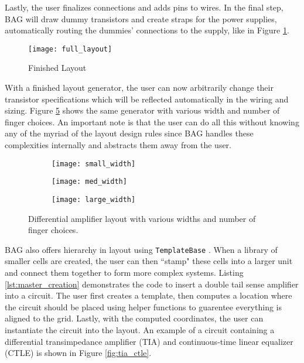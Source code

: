 Lastly, the user finalizes connections and adds pins to wires. In the final step, BAG will draw dummy transistors and create straps for the power supplies, automatically routing the dummies' connections to the supply, like in Figure \ref{fig:finished_layout}.
\begin{figure}[h]
\centering
\texttt{[image: full\_layout]}
\caption{Finished Layout}
\label{fig:finished_layout}
\end{figure}
With a finished layout generator, the user can now arbitrarily change their transistor specifications which will be reflected automatically in the wiring and sizing. Figure \ref{fig:width_changes} shows the same generator with various width and number of finger choices. An important note is that the user can do all this without knowing any of the myriad of the layout design rules since BAG handles these complexities internally and abstracts them away from the user.
\begin{figure}[h]
\centering
\begin{subfigure}{.4\linewidth}
  \centering
  \texttt{[image: small\_width]}
  \caption{}
  \label{fig:sfig1}
\end{subfigure}
\begin{subfigure}{.4\linewidth}
  \centering
\texttt{[image: med\_width]}
  \caption{}
  \label{fig:sfig2}
\end{subfigure}
\begin{subfigure}{.4\linewidth}
  \centering
\texttt{[image: large\_width]}
  \caption{}
  \label{fig:sfig2}
\end{subfigure}
\caption{Differential amplifier layout with various widths and number of finger choices.}
\label{fig:width_changes}
\end{figure}
\clearpage
BAG also offers hierarchy in layout using \texttt{TemplateBase} \cite{chang_bag2:_2018}. When a library of smaller cells are created, the user can then ``stamp" these cells into a larger unit and connect them together to form more complex systems. Listing \ref{lst:master_creation} demonstrates the code to insert a double tail sense amplifier into a circuit. The user first creates a template, then computes a location where the circuit should be placed using helper functions to guarentee everything is aligned to the grid. Lastly, with the computed coordinates, the user can instantiate the circuit into the layout. An example of a circuit containing a differential transimpedance amplifier (TIA) and continuous-time linear equalizer (CTLE) is shown in Figure \ref{fig:tia_ctle}.

